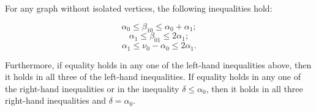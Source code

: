 For any graph without isolated vertices, the following inequalities hold:

$$\alpha_0 \leq \beta_{10} \leq \alpha_0 + \alpha_1;$$
$$\alpha_1 \leq \beta_{01} \leq 2\alpha_1;$$
$$\alpha_1 \leq \nu_0 - \alpha_0 \leq 2\alpha_1.$$

Furthermore, if equality holds in any one of the left-hand inequalities above, then it holds in all three of the left-hand inequalities. If equality holds in any one of the right-hand inequalities or in the inequality $\delta \leq \alpha_0$, then it holds in all three right-hand inequalities and $\delta = \alpha_0$.
